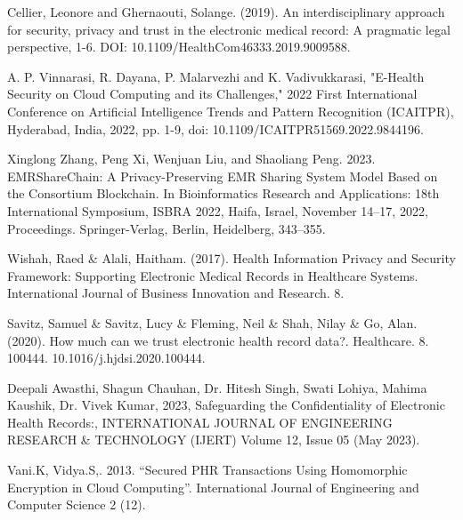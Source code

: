 \documentclass[runningheads]{llncs}
\begin{document}
\begin{thebibliography}{00}
 Cellier, Leonore and Ghernaouti, Solange. (2019). {An interdisciplinary approach for security, privacy and trust in the electronic medical record: A pragmatic legal perspective}, 1-6. DOI: 10.1109/HealthCom46333.2019.9009588.

 A. P. Vinnarasi, R. Dayana, P. Malarvezhi and K. Vadivukkarasi, "E-Health Security on Cloud Computing and its Challenges," 2022 First International Conference on Artificial Intelligence Trends and Pattern Recognition (ICAITPR), Hyderabad, India, 2022, pp. 1-9, doi: 10.1109/ICAITPR51569.2022.9844196.

 Xinglong Zhang, Peng Xi, Wenjuan Liu, and Shaoliang Peng. 2023. EMRShareChain: A Privacy-Preserving EMR Sharing System Model Based on the Consortium Blockchain. In Bioinformatics Research and Applications: 18th International Symposium, ISBRA 2022, Haifa, Israel, November 14–17, 2022, Proceedings. Springer-Verlag, Berlin, Heidelberg, 343–355.

 Wishah, Raed \& Alali, Haitham. (2017). Health Information Privacy and Security Framework: Supporting Electronic Medical Records in Healthcare Systems. International Journal of Business Innovation and Research. 8.

 Savitz, Samuel \& Savitz, Lucy \& Fleming, Neil \& Shah, Nilay \& Go, Alan. (2020). How much can we trust electronic health record data?. Healthcare. 8. 100444. 10.1016/j.hjdsi.2020.100444.

 Deepali Awasthi, Shagun Chauhan, Dr. Hitesh Singh, Swati Lohiya, Mahima Kaushik, Dr. Vivek Kumar, 2023, Safeguarding the Confidentiality of Electronic Health Records:, INTERNATIONAL JOURNAL OF ENGINEERING RESEARCH \& TECHNOLOGY (IJERT) Volume 12, Issue 05 (May 2023).

 Vani.K, Vidya.S,. 2013. “Secured PHR Transactions Using Homomorphic Encryption in Cloud Computing”. International Journal of Engineering and Computer Science 2 (12).

\end{thebibliography}
\end{document}
